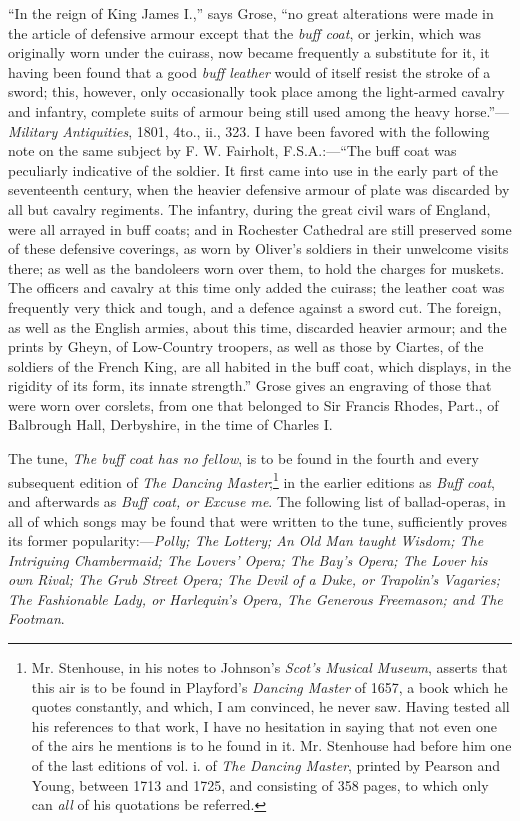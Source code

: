 “In the reign of King James I.,” says Grose, “no great alterations were made
in the article of defensive armour except that the \textit{buff coat}, or jerkin, which was
originally worn under the cuirass, now became frequently a substitute for it, it
having been found that a good \textit{buff leather} would of itself resist the stroke of a
sword; this, however, only occasionally took place among the light-armed cavalry
and infantry, complete suits of armour being still used among the heavy horse.”—
\textit{Military Antiquities}, 1801, 4to., ii., 323. I have been favored with the following
note on the same subject by F. W. Fairholt, F.S.A.:—“The buff coat was
peculiarly indicative of the soldier. It first came into use in the early part of
the seventeenth century, when the heavier defensive armour of plate was discarded
by all but cavalry regiments. The infantry, during the great civil wars
of England, were all arrayed in buff coats; and in Rochester Cathedral are
still preserved some of these defensive coverings, as worn by Oliver’s soldiers
in their unwelcome visits there; as well as the bandoleers worn over them, to hold
the charges for muskets. The officers and cavalry at this time only added the
cuirass; the leather coat was frequently very thick and tough, and a defence
against a sword cut. The foreign, as well as the English armies, about this time,
discarded heavier armour; and the prints by Gheyn, of Low-Country troopers, as
well as those by Ciartes, of the soldiers of the French King, are all habited in
the buff coat, which displays, in the rigidity of its form, its innate strength.”
Grose gives an engraving of those that were worn over corslets, from one that
belonged to Sir Francis Rhodes, Part., of Balbrough Hall, Derbyshire, in the
time of Charles I.

The tune, \textit{The buff coat has no fellow}, is to be found in the fourth and every
subsequent edition of \textit{The Dancing Master};\footnote{\textit{}
Mr. Stenhouse, in his notes to Johnson’s \textit{Scot’s Musical
Museum}, asserts that this air is to be found in Playford’s
\textit{Dancing Master} of 1657, a book which he quotes constantly,
and which, I am convinced, he never saw. Having
tested all his references to that work, I have no hesitation
in saying that not even one of the airs he mentions
is to he found in it. Mr. Stenhouse had before him one
of the last editions of vol. i. of \textit{The Dancing Master},
printed by Pearson and Young, between 1713 and 1725,
and consisting of 358 pages, to which only can \textit{all} of his
quotations be referred.}
 in the earlier editions as \textit{Buff coat},
and afterwards as \textit{Buff coat, or Excuse me}. The following list of ballad-operas, in
all of which songs may be found that were written to the tune, sufficiently proves
its former popularity:—\textit{Polly; The Lottery; An Old Man taught Wisdom; The
Intriguing Chambermaid; The Lovers’ Opera; The Bay’s Opera; The Lover his
own Rival; The Grub Street Opera; The Devil of a Duke, or Trapolin’s Vagaries;
The Fashionable Lady, or Harlequin’s Opera, The Generous Freemason; and
The Footman}.

